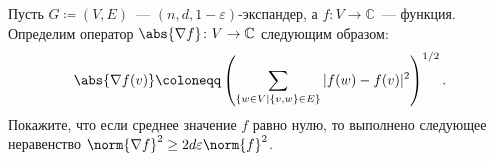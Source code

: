 Пусть $G \coloneqq (V, E)$~--- $(n, d, 1 - \varepsilon)$-экспандер, а $f \colon V \rightarrow
\mathbb{C}$~--- функция. Определим оператор $\abs{\nabla f} \colon V \rightarrow \mathbb{C}$ следующим
образом:
$$
    \abs{\nabla f(v)} \coloneqq
    \left(\sum\limits_{\{w \in V \mid \{v, w\} \in E\}} |f(w) - f(v)|^2\right)^{1 / 2}.
$$
Покажите, что если среднее значение $f$ равно нулю, то выполнено следующее неравенство $\norm{\nabla f}^2
\ge 2 d \varepsilon \norm{f}^2$.